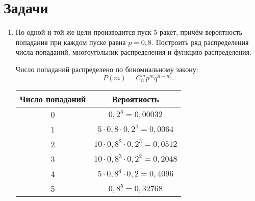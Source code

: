\section{Задачи}
    \begin{enumerate}
        \item По одной и той же цели производится пуск 5 ракет, причём
            вероятность попадания при каждом пуске равна \( p = 0,8 \).
            Построить ряд распределения числа попаданий, многоугольник
            распределения и функцию распределения.

            Число попаданий распределено по биномиальному закону:
            \[
                P(m) = C_n^m p^m q^{n-m}.
            \]
            \begin{table}[h!]
                \center
                \begin{tabular}{|c|c|} \hline
                    Число попаданий & Вероятность \\ \hline
                    0 & \( 0,2^5 = 0,00032 \) \\
                    1 & \( 5 \cdot 0,8 \cdot 0,2^4 = 0,0064 \) \\
                    2 & \( 10 \cdot 0,8^2 \cdot 0,2^3 = 0,0512 \) \\
                    3 & \( 10 \cdot 0,8^3 \cdot 0,2^2 = 0,2048 \) \\
                    4 & \( 5 \cdot 0,8^4 \cdot 0,2 = 0,4096 \) \\
                    5 & \( 0,8^5 = 0,32768 \) \\ \hline
                \end{tabular}
            \end{table}
            \begin{figure}[h]
                \center
\end{figure}
\end{enumerate}
